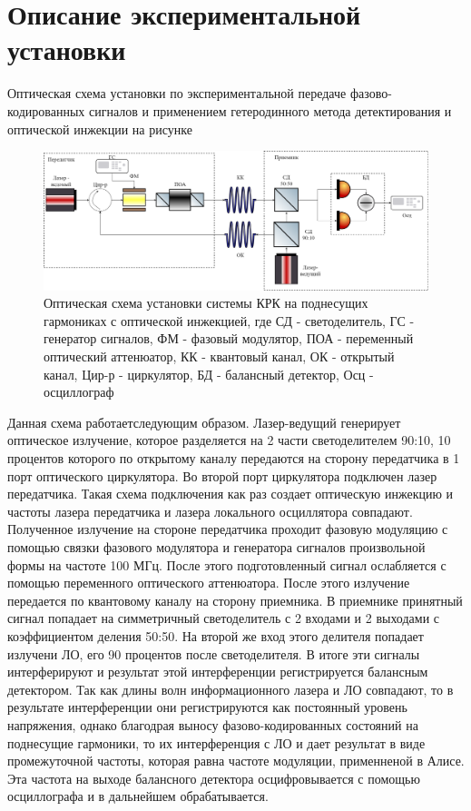 \section{Описание экспериментальной установки}\label{sec:ch2/sect5}
Оптическая схема установки по экспериментальной передаче фазово-кодированных сигналов и применением гетеродинного метода детектирования и оптической инжекции на рисунке 
\begin{figure}
    \centering
    \includegraphics[width=\textwidth]{images/Схема с обратной связью новая 2 .png}
    \caption{Оптическая схема установки системы КРК на поднесущих гармониках с оптической инжекцией, где СД - светоделитель, ГС - генератор сигналов, ФМ - фазовый модулятор, ПОА - переменный оптический аттенюатор, КК - квантовый канал, ОК - открытый канал, Цир-р - циркулятор, БД - балансный детектор, Осц - осциллограф}
    \label{fig:feedback scheme ch2}
\end{figure}
Данная схема работаетследующим образом. Лазер-ведущий генерирует оптическое излучение, которое разделяется на 2 части светоделителем 90:10, 10 процентов которого по открытому каналу передаются на сторону передатчика в 1 порт оптического циркулятора. Во второй порт циркулятора подключен лазер передатчика. Такая схема подключения как раз создает оптическую инжекцию и частоты лазера передатчика и лазера локального осциллятора совпадают. Полученное излучение на стороне передатчика проходит фазовую модуляцию с помощью связки фазового модулятора и генератора сигналов произвольной формы на частоте 100 МГц. После этого подготовленный сигнал ослабляется с помощью переменного оптического аттенюатора. После этого излучение передается по квантовому каналу на сторону приемника. В приемнике принятный сигнал попадает на симметричный светоделитель с 2 входами и 2 выходами с коэффициентом деления 50:50. На второй же вход этого делителя попадает излучени ЛО, его 90 процентов после светоделителя. В итоге эти сигналы интерферируют и результат этой интерференции регистрируется балансным детектором. Так как длины волн информационного лазера и ЛО совпадают, то в результате интерференции они регистрируются как постоянный уровень напряжения, однако благодрая выносу фазово-кодированных состояний на поднесущие гармоники, то их интерференция с ЛО и дает результат в виде промежуточной частоты, которая равна частоте модуляции, применненой в Алисе. Эта частота на выходе балансного детектора осцифровывается с помощью осциллографа и в дальнейшем обрабатывается. 
